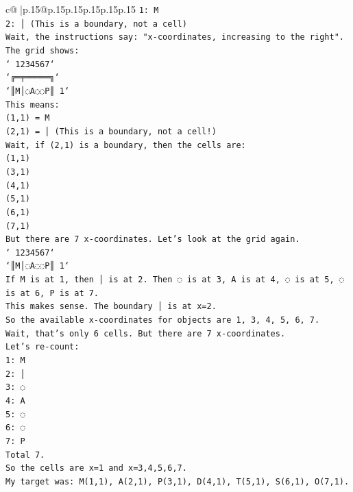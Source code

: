 \documentclass{article}
\begin{document}
{\begin{supertabular}{c@{$\;$}|p{.15\linewidth}@{}p{.15\linewidth}p{.15\linewidth}p{.15\linewidth}p{.15\linewidth}p{.15\linewidth}}
{{{\texttt{1: M} \\
\texttt{2: │ (This is a boundary, not a cell)} \\
\texttt{Wait, the instructions say: "x{-}coordinates, increasing to the right".} \\
\texttt{The grid shows:} \\
\texttt{` 1234567`} \\
\texttt{`╔═╤═════╗`} \\
\texttt{`║M│◌A◌◌P║ 1`} \\
\texttt{This means:} \\
\texttt{(1,1) = M} \\
\texttt{(2,1) = │ (This is a boundary, not a cell!)} \\
\texttt{Wait, if (2,1) is a boundary, then the cells are:} \\
\texttt{(1,1)} \\
\texttt{(3,1)} \\
\texttt{(4,1)} \\
\texttt{(5,1)} \\
\texttt{(6,1)} \\
\texttt{(7,1)} \\
\texttt{But there are 7 x{-}coordinates. Let's look at the grid again.} \\
\texttt{` 1234567`} \\
\texttt{`║M│◌A◌◌P║ 1`} \\
\texttt{If M is at 1, then │ is at 2. Then ◌ is at 3, A is at 4, ◌ is at 5, ◌ is at 6, P is at 7.} \\
\texttt{This makes sense. The boundary │ is at x=2.} \\
\texttt{So the available x{-}coordinates for objects are 1, 3, 4, 5, 6, 7.} \\
\texttt{Wait, that's only 6 cells. But there are 7 x{-}coordinates.} \\
\texttt{Let's re{-}count:} \\
\texttt{1: M} \\
\texttt{2: │} \\
\texttt{3: ◌} \\
\texttt{4: A} \\
\texttt{5: ◌} \\
\texttt{6: ◌} \\
\texttt{7: P} \\
\texttt{Total 7.} \\
\texttt{So the cells are x=1 and x=3,4,5,6,7.} \\
\texttt{My target was: M(1,1), A(2,1), P(3,1), D(4,1), T(5,1), S(6,1), O(7,1).} \\
}}}
\end{supertabular}}
\end{document}
